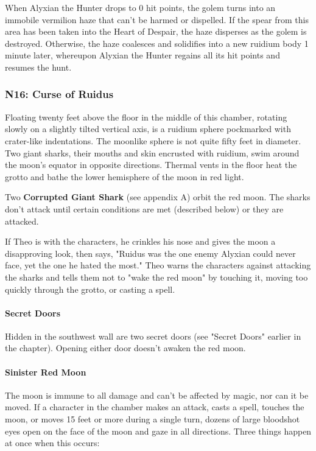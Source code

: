 \documentclass[10pt,a4paper,twoside,bg=print,twocolumn,openany,nodeprecatedcode]{dndbook}
\begin{document}
When Alyxian the Hunter drops to 0 hit points, the golem turns into an immobile vermilion haze that can't be harmed or dispelled. If the spear from this area has been taken into the Heart of Despair, the haze disperses as the golem is destroyed. Otherwise, the haze coalesces and solidifies into a new ruidium body 1 minute later, whereupon Alyxian the Hunter regains all its hit points and resumes the hunt.

\subsubsection{N16: Curse of Ruidus}
\begin{DndReadAloud}{}
Floating twenty feet above the floor in the middle of this chamber, rotating slowly on a slightly tilted vertical axis, is a ruidium sphere pockmarked with crater-like indentations. The moonlike sphere is not quite fifty feet in diameter. Two giant sharks, their mouths and skin encrusted with ruidium, swim around the moon's equator in opposite directions. Thermal vents in the floor heat the grotto and bathe the lower hemisphere of the moon in red light.

\end{DndReadAloud}

Two \textbf{Corrupted Giant Shark} (see appendix A) orbit the red moon. The sharks don't attack until certain conditions are met (described below) or they are attacked.

If Theo is with the characters, he crinkles his nose and gives the moon a disapproving look, then says, "Ruidus was the one enemy Alyxian could never face, yet the one he hated the most." Theo warns the characters against attacking the sharks and tells them not to "wake the red moon" by touching it, moving too quickly through the grotto, or casting a spell.

\paragraph{Secret Doors}
Hidden in the southwest wall are two secret doors (see "Secret Doors" earlier in the chapter). Opening either door doesn't awaken the red moon.

\paragraph{Sinister Red Moon}
The moon is immune to all damage and can't be affected by magic, nor can it be moved. If a character in the chamber makes an attack, casts a spell, touches the moon, or moves 15 feet or more during a single turn, dozens of large bloodshot eyes open on the face of the moon and gaze in all directions. Three things happen at once when this occurs:
\end{document}
